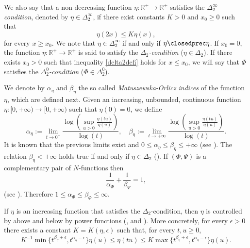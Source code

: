 \documentclass[twoside]{elsarticle}
\theoremstyle{remark}
\renewcommand{\leq}{\leqslant}
\renewcommand{\geq}{\geqslant}
\begin{document}
We also say that a non decreasing function $\eta:\mathbb{R}^+\rightarrow \mathbb{R}^+$ satisfies the  \emph{$\Delta_2^{\infty}$-condition}, denoted by $\eta \in \Delta_2^{\infty}$,
if there exist  constants $K>0$ and  $x_0\geq 0$ such that
\begin{equation}\label{delta2defi}\eta(2x)\leq K\eta(x),
\end{equation}
for every $x\geq x_0$. We note that $\eta \in \Delta_2^{\infty}$ if and only if $\eta\closedprec\eta$.
If $x_0=0$,  the function   $\eta:\mathbb{R}^+\rightarrow \mathbb{R}^+$ is said to satisfy the 
\emph{$\Delta_2$-condition} ($\eta \in \Delta_2$). 
If there exists $x_0>0$ such that  inequality \eqref{delta2defi} holds for $x\leq x_0$, 
we will say that $\Phi$ satisfies the 
\emph{$\Delta_2^0$-condition} ($\Phi\in\Delta_2^0$).

We denote by $\alpha_{\eta}$ and $\beta_{\eta}$ the so called  \emph{Matuszewska-Orlicz indices} of the function $\eta$, which are defined next. Given
an increasing, unbounded, continuous function   $\eta:[ 0,+\infty)\to [0,+\infty)$ such that $\eta(0)=0$, we define
\begin{equation}\label{MO_indices}
    \alpha_{\eta}:=\lim\limits_{t\to 0^{+}}\frac{\log \left (\sup\limits_{u>0}\frac{\eta(t u)}{\eta(u)} \right ) }{\log(t)},\quad
    \beta_{\eta}:=\lim\limits_{t\to +\infty}\frac{\log \left  (\sup\limits_{u>0}\frac{\eta(t u)}{\eta(u)}\right )}{\log(t)}.
\end{equation}
It is known that the previous limits exist and  $0\leq \alpha_{\eta}\leq \beta_{\eta}\leq +\infty$ 
(see \cite[p. 84]{M}). The relation $\beta_{\eta}<+\infty$ holds true if and only if $\eta \in \Delta_2$
(\cite[Thm. 11.7]{M}). If $(\Phi,\Psi)$ is a complementary pair of  $N$-functions then
\begin{equation}\label{compl_ind}
 \frac{1}{\alpha_{\Phi}}+\frac{1}{\beta_{\Psi}}=1,
\end{equation}
(see \cite[Cor. 11.6]{M}). Therefore $1\leq \alpha_{\Phi}\leq\beta_{\Phi}\leq \infty $.

 If $\eta$ is an increasing function that satisfies the $\Delta_2$-condition, then $\eta$ is controlled by above and below
 by power functions (\cite[Sec. 1]{Gustavsson1977}, \cite[Eq. (2.3)-(2.4)]{fiorenza1997indices} and \cite[Thm. 11.13]{M}).   More concretely, for every $\epsilon>0$ there exists a
constant $K=K(\eta,\epsilon)$ such that, for every $t,u\geq 0$,
\begin{equation}\label{delta2-potencias}
    K^{-1}\min\big\{t^{\beta_{\eta}+\epsilon},t^{\alpha_{\eta}-\epsilon} \big\}\eta(u)\leq \eta(t u)\leq
    K\max\big\{t^{\beta_{\eta}+\epsilon},t^{\alpha_{\eta}-\epsilon} \big\}\eta(u).
\end{equation}
\end{document}
